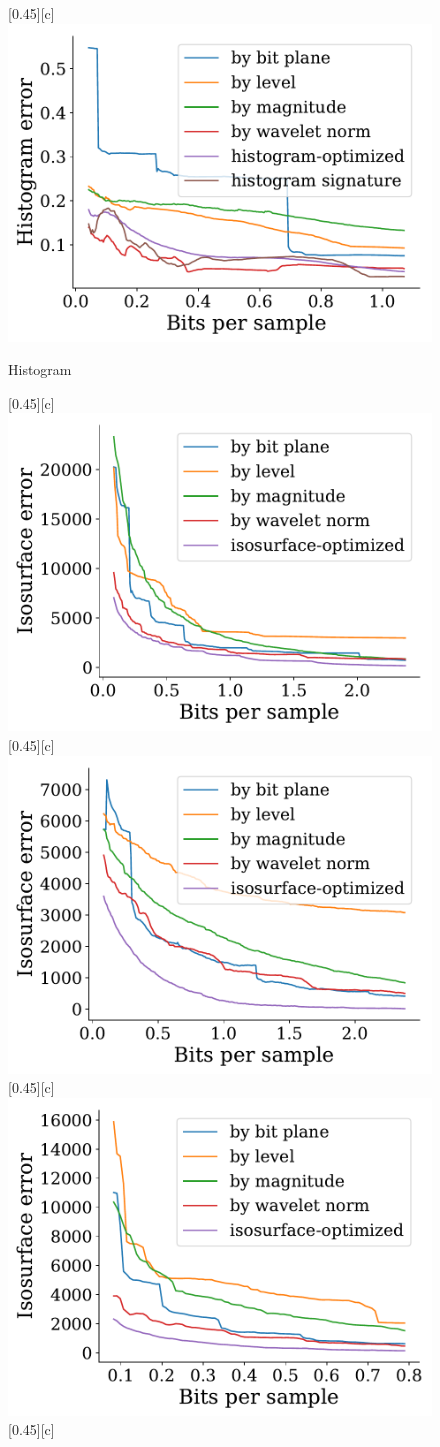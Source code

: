 \documentclass{article}
\begin{document}
\begin{figure}[htb]
        [0.45\linewidth][c]{%
                \includegraphics[width=0.4\linewidth]{img/supplementary/histogram-optimized-kingsnake}}
        \caption{Histogram}
\end{figure}


\begin{figure}[htb]
        \centering
        [0.45\linewidth][c]{%
                \includegraphics[width=0.4\linewidth]{img/supplementary/isocontour-optimized-csafe}}
        [0.45\linewidth][c]{%
                \includegraphics[width=0.4\linewidth]{img/supplementary/isocontour-optimized-enzo-v}}
        [0.45\linewidth][c]{%
                \includegraphics[width=0.4\linewidth]{img/supplementary/isocontour-optimized-flame}}
        [0.45\linewidth][c]{%
}
\end{figure}
\end{document}
